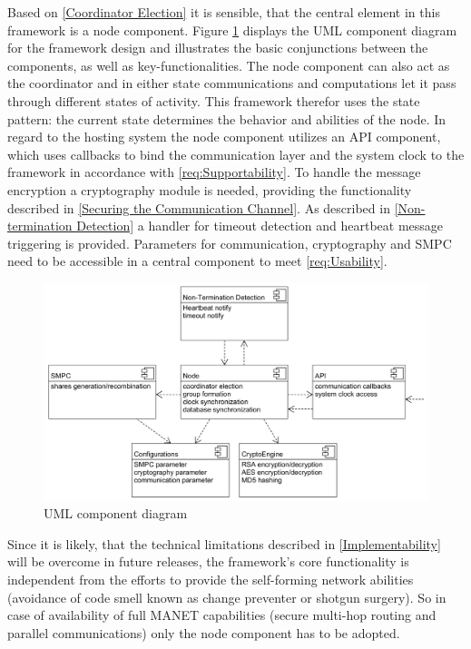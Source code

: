 Based on \ref{Coordinator Election} it is sensible, that the central element in this framework is a node component. Figure \ref{figure:UML component diagram} displays the \gls{UML} component diagram for the framework design and illustrates the basic conjunctions between the components, as well as key-functionalities. The node component can also act as the coordinator and in either state communications and computations let it pass through different states of activity. This framework therefor uses the state pattern: the current state determines the behavior and abilities of the node.
In regard to the hosting system the node component utilizes an \gls{API} component, which uses callbacks to bind the communication layer and the system clock to the framework in accordance with \ref{req:Supportability}. To handle the message encryption a cryptography module is needed, providing the functionality described in \ref{Securing the Communication Channel}. As described in \ref{Non-termination Detection} a handler for timeout detection and heartbeat message triggering is provided. Parameters for communication, cryptography and \gls{SMPC} need to be accessible in a central component to meet \ref{req:Usability}.

\begin{figure}[!htbp] %
	\caption{\gls{UML} component diagram} \label{figure:UML component diagram}
	\includegraphics[scale=1.0]{figures/uml-component.png}
\end{figure}

Since it is likely, that the technical limitations described in \ref{Implementability} will be overcome in future releases, the framework's core functionality is independent from the efforts to provide the self-forming network abilities (avoidance of code smell known as change preventer or shotgun surgery). So in case of availability of full \gls{MANET} capabilities (secure multi-hop routing and parallel communications) only the node component has to be adopted.

